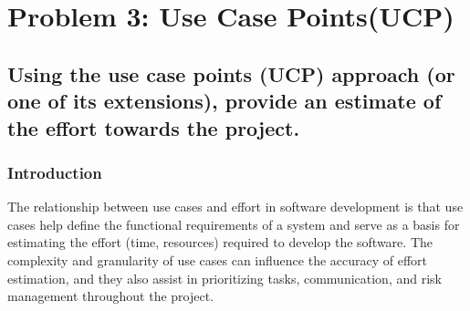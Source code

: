 \section{Problem 3: Use Case Points(UCP)}

\subsection{Using the use case points (UCP) approach (or one of its extensions), provide an estimate of the effort towards the project. }

\subsubsection{Introduction}
\normalsize{The relationship between use cases and effort in software development is that use cases help define the functional requirements of a system and serve as a basis for estimating the effort (time, resources) required to develop the software. The complexity and granularity of use cases can influence the accuracy of effort estimation, and they also assist in prioritizing tasks, communication, and risk management throughout the project.}

